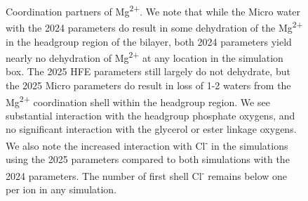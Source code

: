 \documentclass[journal=langd5,manuscript=article]{achemso}
\newcommand{\mg}{Mg\textsuperscript{2+}}
\newcommand{\cl}{Cl\textsuperscript{-}}
\begin{document}
\begin{figure}[H]
    \caption{Coordination partners of \mg{}. We note that while the Micro water with the 2024 parameters do result in some dehydration 
        of the \mg{} in the headgroup region of the bilayer, both 2024 parameters yield nearly no dehydration of \mg{} at any location in the simulation box. The 2025 HFE parameters
        still largely do not dehydrate, but the 2025 Micro parameters do result in loss of 1-2 waters from the \mg{} coordination shell within the headgroup region. 
        We see substantial interaction with the headgroup phosphate oxygens, and no significant interaction with the glycerol or ester linkage oxygens. We also note the increased interaction with \cl{} in the 
    simulations using the 2025 parameters compared to both simulations with the 2024 parameters. The number of first shell \cl{} remains below one per ion in any simulation.}
\label{fig:ioncoordination}

\end{figure}
\end{document}
